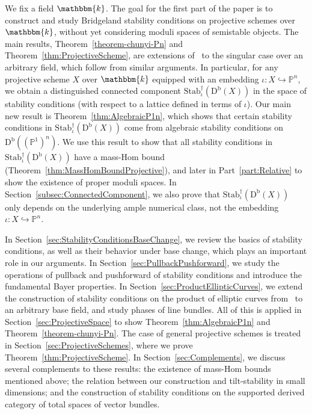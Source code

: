 \documentclass[11pt, reqno]{amsart}
\numberwithin{equation}{section}
\theoremstyle{plain}
\theoremstyle{remark}
\theoremstyle{definition}
\theoremstyle{italicsname}
\newcommand{\Db}{\mathrm{D^b}}
\newcommand{\Stabdagger}{\mathrm{Stab}^\dagger}
\newcommand{\KK}{\mathbbm{k}}
\def\PP{\ensuremath{\mathbb{P}}}
\begin{document}
We fix a field $\KK$.
The goal for the first part of the paper is to construct and study Bridgeland stability conditions on projective schemes over $\KK$, without yet considering moduli spaces of semistable objects. 
The main results, Theorem~\ref{theorem-chunyi-Pn} and Theorem~\ref{thm:ProjectiveScheme}, are extensions of~\cite{chunyi-stability} to the singular case over an arbitrary field, which follow from similar arguments. 
In particular, for any projective scheme $X$ over $\KK$ equipped with an embedding $\iota \colon X \hookrightarrow \PP^n$, we obtain a distinguished connected component $\Stabdagger_{\iota}(\Db(X))$ in the space of stability conditions (with respect to a lattice defined in terms of $\iota$). 
Our main new result is Theorem~\ref{thm:AlgebraicP1n}, which shows that certain stability conditions in $\Stabdagger_{\iota}(\Db(X))$ come from algebraic stability conditions on $\Db((\PP^1)^n)$. 
We use this result to show that all stability conditions in $\Stabdagger_{\iota}(\Db(X))$ have a mass-Hom bound (Theorem~\ref{thm:MassHomBoundProjective}), and later in Part~\ref{part:Relative} to show the existence of proper moduli spaces. 
In Section~\ref{subsec:ConnectedComponent}, we also prove that $\Stabdagger_{\iota}(\Db(X))$ only depends on the underlying ample numerical class, not the embedding $\iota \colon X \hookrightarrow \PP^n$. 

In Section~\ref{sec:StabilityConditionsBaseChange}, we review the basics of stability conditions, as well as their behavior under base change, which plays an important role in our arguments.
In Section~\ref{sec:PullbackPushforward}, we study the operations of pullback and pushforward of stability conditions and introduce the fundamental Bayer properties.
In Section~\ref{sec:ProductEllipticCurves}, we extend the construction of stability conditions on the product of elliptic curves from~\cite{Liu:StabProd} to an arbitrary base field, and study phases of line bundles.
All of this is applied in Section~\ref{sec:ProjectiveSpace} to show Theorem~\ref{thm:AlgebraicP1n} and Theorem~\ref{theorem-chunyi-Pn}.
The case of general projective schemes is treated in Section~\ref{sec:ProjectiveSchemes}, where we prove Theorem~\ref{thm:ProjectiveScheme}. 
In Section~\ref{sec:Complements}, we discuss several complements to these results: the existence of mass-Hom bounds mentioned above; the relation between our construction and tilt-stability in small dimensions; and the construction of stability conditions on the supported derived category of total spaces of vector bundles. 
\end{document}
